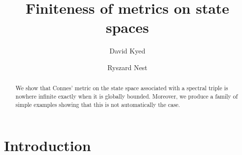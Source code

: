 \documentclass[12pt,a4paper,twoside,reqno]{amsart}
\theoremstyle{plain}
\theoremstyle{definition}
\theoremstyle{remark} %
\theoremstyle{plain}
\numberwithin{equation}{section}
\begin{document}
\author{David Kyed}
\address{David Kyed, Department of Mathematics and Computer Science, University of Southern Denmark, Campusvej 55, DK-5230 Odense M, Denmark}

\author{Ryszard Nest}
\address{Ryszard Nest,  Department of Mathematical Sciences, Universitetsparken 5, 2100 København {\O} \\ Denmark}










\title{Finiteness of metrics on state spaces} 



\begin{abstract}
We show that Connes' metric on the state space associated with a spectral triple is nowhere infinite exactly when it is globally bounded. Moreover, we produce a family of simple examples showing that this is not automatically the case.
\end{abstract}

\maketitle






\section{Introduction}

 
 
 
 
\end{document}
